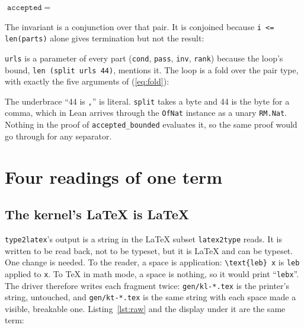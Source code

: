 \documentclass[11pt]{article}
\newcommand{\code}[1]{\texttt{#1}}
\begin{document}
\medskip
{\tiny\noindent$\code{accepted} \;=\; $}
\medskip

\noindent
The invariant is a conjunction over that pair. It is conjoined because
\code{i <= len(parts)} alone gives termination but not the result:



\code{urls} is a parameter of every part (\code{cond}, \code{pass},
\code{inv}, \code{rank}) because the loop's bound, \code{len (split urls 44)},
mentions it. The loop is a fold over the pair type, with exactly the five
arguments of (\ref{eq:fold}):



The underbrace ``44 is \code{,}'' is literal. \code{split} takes a byte and
44 is the byte for a comma, which in Lean arrives through the \code{OfNat}
instance as a unary \code{RM.Nat}. Nothing in the proof of
\code{accepted\_bounded} evaluates it, so the same proof would go through
for any separator.

\section{Four readings of one term}
\label{sec:four}

\subsection{The kernel's \LaTeX{} is \LaTeX{}}

\code{type2latex}'s output is a string in the \LaTeX{} subset
\code{latex2type} reads. It is written to be read back, not to be typeset, but
it is \LaTeX{} and can be typeset. One change is needed. To the reader, a space
is application: \code{\textbackslash text\{leb\} x} is \code{leb} applied to
\code{x}. To \TeX{} in math mode, a space is nothing, so it would print
``\code{lebx}''. The driver therefore writes each fragment twice:
\code{gen/kl-*.tex} is the printer's string, untouched, and
\code{gen/kt-*.tex} is the same string with each space made a visible,
breakable one. Listing~\ref{lst:raw} and the display under it are the same
term:


\end{document}
